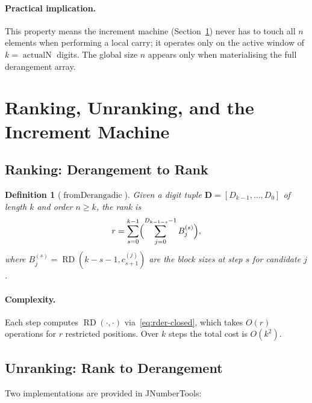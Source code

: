 \documentclass[11pt,a4paper]{article}
\newtheorem{definition}{Definition}[section]
\newcommand{\rder}[2]{\operatorname{RD}(#1,#2)} %
\newcommand{\actualN}{\operatorname{actualN}}
\begin{document}
    \paragraph{Practical implication.}
    This property means the increment machine (Section~\ref{sec:algorithms})
    never has to touch all $n$ elements when performing a local carry; it
    operates only on the active window of $k = \actualN$ digits. The global
    size $n$ appears only when materialising the full derangement array.

    \section{Ranking, Unranking, and the Increment Machine}
    \label{sec:algorithms}

    \subsection{Ranking: Derangement to Rank}

    \begin{definition}[$\operatorname{fromDerangadic}$]
        \label{def:from-derangadic}
        Given a digit tuple $\mathbf{D} = [D_{k-1}, \dots, D_0]$ of length $k$ and
        order $n \geq k$, the rank is
        \begin{equation}
            r = \sum_{s=0}^{k-1} \Bigl( \sum_{j=0}^{D_{k-1-s}-1} B_j^{(s)} \Bigr),
            \label{eq:rank}
        \end{equation}
        where $B_j^{(s)} = \rder{k-s-1}{c_{s+1}^{(j)}}$ are the block sizes at step
        $s$ for candidate $j$.
    \end{definition}

    \paragraph{Complexity.}
    Each step computes $\rder{\cdot}{\cdot}$ via~\eqref{eq:rder-closed}, which takes
    $O(r)$ operations for $r$ restricted positions. Over $k$ steps the total
    cost is $O(k^2)$.

    \subsection{Unranking: Rank to Derangement}

    Two implementations are provided in JNumberTools:
\end{document}
